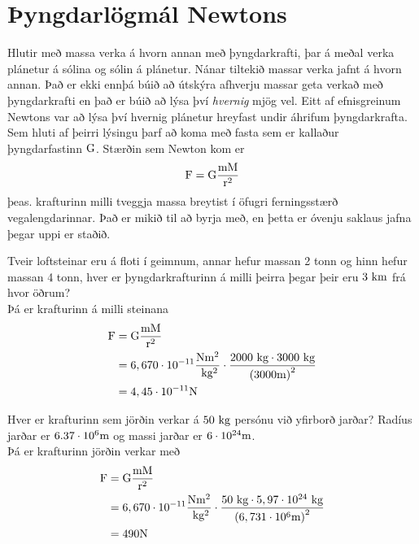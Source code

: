 \chapter[Þyngdarlögmál]{Þyngdarlögmál Newtons}
Hlutir með massa verka á hvorn annan með þyngdarkrafti, þar á meðal verka
plánetur á sólina og sólin á plánetur. Nánar tiltekið massar verka jafnt á
hvorn annan. Það er ekki ennþá búið að útskýra afhverju massar geta
verkað með þyngdarkrafti en það er búið að lýsa því \emph{hvernig}
mjög vel. Eitt af efnisgreinum Newtons var að lýsa því hvernig
plánetur hreyfast undir áhrifum þyngdarkrafta. Sem hluti af þeirri lýsingu
þarf að koma með fasta sem er kallaður þyngdarfastinn $\text{G}$.
Stærðin sem Newton kom er
\begin{equation}
	\textrm{F} = \text{G} \frac{\textrm{m} \textrm{M}}{\textrm{r}^2}
\end{equation}
þeas. krafturinn milli tveggja massa breytist í öfugri ferningsstærð
vegalengdarinnar. Það er mikið til að byrja með, en þetta er
óvenju saklaus jafna þegar uppi er staðið.

\begin{formalexample}
Tveir loftsteinar eru á floti í geimnum, annar hefur massan 2 tonn og hinn hefur
massan 4 tonn, hver er þyngdarkrafturinn á milli þeirra þegar þeir eru $3 \textrm{ k}\textrm{m}$
frá hvor öðrum?
\\[4 ex]
Þá er krafturinn á milli steinana
\begin{align*}
	\textrm{F} &= \text{G} \frac{\textrm{m} \textrm{M}}{\textrm{r}^2} \\
		&= 6,670 \cdot 10^{-11} \frac{\textrm{N} \textrm{m}^2}{\textrm{ k}\textrm{g}^2} \cdot \frac{ 2000 \textrm{ k}\textrm{g} \cdot 3000 \textrm{ k}\textrm{g}}{\left( 3000\textrm{m} \right)^2} \\
		&= 4,45 \cdot 10^{-11} \textrm{N}
\end{align*}
\end{formalexample}

\begin{formalexample}
Hver er krafturinn sem jörðin verkar á $50 \textrm{ k}\textrm{g}$ persónu við yfirborð
jarðar?
Radíus jarðar er $6.37 \cdot 10^{6} \textrm{m}$ og massi jarðar er $6 \cdot 10^{24} \textrm{m}$.
\\[4 ex]
Þá er krafturinn jörðin verkar með
\begin{align*}
	\textrm{F} &= \text{G} \frac{\textrm{m} \textrm{M}}{\textrm{r}^2} \\
		&= 6,670 \cdot 10^{-11} \frac{\textrm{N} \textrm{m}^2}{\textrm{ k}\textrm{g}^2} 
			\cdot \frac{ 50 \textrm{ k}\textrm{g} \cdot 
				5,97 \cdot 10^{24} \textrm{ k}\textrm{g}}{\left( 6,731 \cdot 10^{6} \textrm{m} \right)^2} \\
		&= 490 \textrm{N}
\end{align*}
\end{formalexample}


